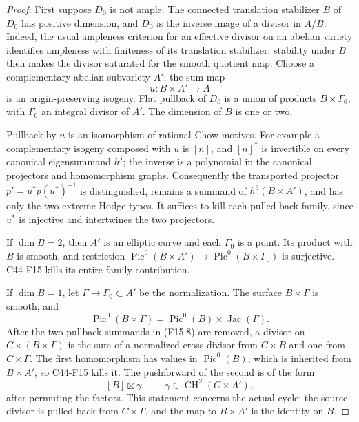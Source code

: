 \documentclass[11pt]{article}
\theoremstyle{remark}\newtheorem{remark}[theorem]{Remark}
\begin{document}
\begin{proof}
First suppose $D_0$ is not ample.  The connected translation
stabilizer $B$ of $D_0$ has positive dimension, and $D_0$ is the
inverse image of a divisor in $A/B$.  Indeed, the usual
ampleness criterion for an effective divisor on an abelian variety
identifies ampleness with finiteness of its translation stabilizer;
stability under $B$ then makes the divisor saturated for the
smooth quotient map.  Choose a complementary abelian subvariety
$A'$; the sum map
\[
                    u:B\times A'\longrightarrow A
 \tag{F16.3}
\]
is an origin-preserving isogeny.  Flat pullback of $D_0$ is a union
of products $B\times\Gamma_0$, with $\Gamma_0$ an integral
divisor of $A'$.  The dimension of $B$ is one or two.

Pullback by $u$ is an isomorphism of rational Chow motives.
For example a complementary isogeny composed with $u$ is $[n]$,
and $[n]^*$ is invertible on every canonical eigensummand
$h^j$; the inverse is a polynomial in the canonical projectors
and homomorphism graphs.  Consequently the transported projector
$p'=u^*p(u^*)^{-1}$ is distinguished, remains a summand of
$h^3(B\times A')$, and has only the two extreme Hodge types.
It suffices to kill each pulled-back family, since $u^*$ is
injective and intertwines the two projectors.

If $\dim B=2$, then $A'$ is an elliptic curve and each
$\Gamma_0$ is a point.  Its product with $B$ is smooth, and
restriction $\operatorname{Pic}^0(B\times A')\to
\operatorname{Pic}^0(B\times\Gamma_0)$ is surjective.  C44-F15
kills its entire family contribution.

If $\dim B=1$, let $\Gamma\to\Gamma_0\subset A'$ be the
normalization.  The surface $B\times\Gamma$ is smooth, and
\[
 \operatorname{Pic}^0(B\times\Gamma)
       =\operatorname{Pic}^0(B)\times\operatorname{Jac}(\Gamma).
 \tag{F16.4}
\]
After the two pullback summands in (F15.8) are removed, a
divisor on $C\times(B\times\Gamma)$ is the sum of a normalized
cross divisor from $C\times B$ and one from $C\times\Gamma$.
The first homomorphism has values in $\operatorname{Pic}^0(B)$,
which is inherited from $B\times A'$, so C44-F15 kills it.
The pushforward of the second is of the form
\[
                        [B]\boxtimes\gamma,
       \qquad \gamma\in\operatorname{CH}^2(C\times A'),
 \tag{F16.5}
\]
after permuting the factors.  This statement concerns the actual
cycle: the source divisor is pulled back from $C\times\Gamma$,
and the map to $B\times A'$ is the identity on $B$.


\end{proof}
\end{document}
